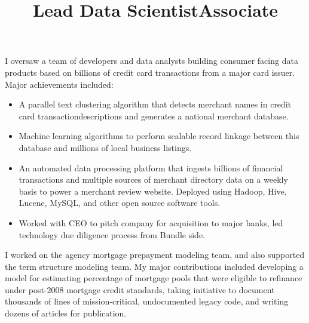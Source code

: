 \begin{resume}
\title{Lead Data Scientist}
\begin{position}
I oversaw a team of developers and data analysts building consumer facing data products based on billions of credit card transactions from a major card issuer. Major achievements included:
\begin{itemize}
\item A parallel text clustering algorithm that detects merchant names in credit card transactiondescriptions and generates a national merchant database.
\item Machine learning algorithms to perform scalable record linkage between this database and millions of local business listings.
\item An automated data processing platform that ingests billions of financial transactions and multiple sources of merchant directory data on a weekly basis to power a merchant review website. Deployed using Hadoop, Hive, Lucene, MySQL, and other open source software tools.
\item Worked with CEO to pitch company for acquisition to major banks, led technology due diligence process from Bundle side.
\end{itemize}
\end{position}

\title{Associate}
\begin{position}
I worked on the agency mortgage prepayment modeling team, and also supported the term structure modeling team. My major contributions included developing a model for estimating percentage of mortgage pools that were eligible to refinance under post-2008 mortgage credit standards, taking initiative to document thousands of lines of mission-critical, undocumented legacy code, and writing dozens of articles for publication. %
\end{position}


\end{resume}
